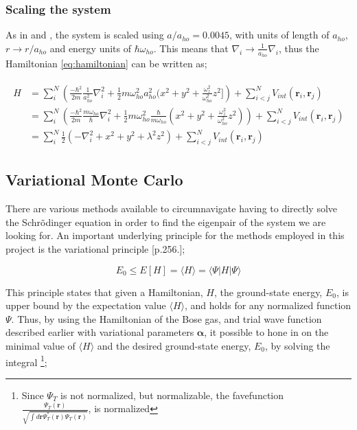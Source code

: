 \documentclass[%
oneside,                 %
final,                   %
10pt]{article}
\begin{document}
\subsubsection{Scaling the system}
As in \citep{VMCHJ} and \citep{VMCdubois}, the system is scaled using $a/a_{ho}=0.0045$, with units of length of $a_{ho}$, $r\rightarrow r/a_{ho}$ and energy units of $\hbar \omega_{ho}$. This means that $\nabla_i\rightarrow \frac{1}{a_{ho}} \nabla_i$, thus the Hamiltonian \eqref{eq:hamiltonian} can be written as;

\begin{align}
\begin{split}
  H &= \sum_i^N \left(\frac{-\hbar^2}{2m}\frac{1}{a_{ho}^2} \nabla_i^2 +
  \frac{1}{2}m \omega_{ho}^2a_{ho}^2(x^2+y^2+ \frac{\omega_z^2}{\omega_{ho}^2}z^2]  
  \right)  +
	 \sum_{i<j}^{N} V_{int}({\mathbf{r}}_i,{\mathbf{r}}_j) \\
	 &= \sum_i^N \left(\frac{-\hbar^2}{2m}\frac{m \omega_{ho}}{\hbar} \nabla_i^2 +
  \frac{1}{2}m   \omega_{ho}^2 \frac{\hbar}{m \omega_{ho}}(x^2+y^2+ \frac{\omega_z^2}{\omega_{ho}^2}z^2)  
  \right)  +
	 \sum_{i<j}^{N} V_{int}({\mathbf{r}}_i,{\mathbf{r}}_j) \\
	  &= \sum_i^N \frac{1}{2} \left(- \nabla_i^2 +x^2+y^2+ \lambda^2 z^2  
  \right)  +
	 \sum_{i<j}^{N} V_{int}({\mathbf{r}}_i,{\mathbf{r}}_j) \label{eq:scaled_H}
\end{split}
\end{align}
\subsection{Variational Monte Carlo} \label{S:VMC}
There are various methods available to circumnavigate having to directly solve the Schrõdinger equation in order to find the eigenpair of the system we are looking for. An important underlying principle for the methods employed in this project is the variational principle \citep{Griffiths95}[p.256.]; 

\begin{equation}
E_0\leq E[H]= \langle H \rangle = \langle \Psi | H | \Psi \rangle
\end{equation}

This principle states that given a Hamiltonian, $H$, the ground-state energy, $E_0$, is upper bound by the expectation value $\langle H \rangle $, and holds for any normalized function $\Psi$. Thus, by using the Hamiltonian of the Bose gas, and trial wave function described earlier with variational parameters $\bm \alpha$, it possible to hone in on the minimal value of $\langle H \rangle$ and the desired ground-state energy, $E_0$, by solving the integral \footnote{Since $\Psi_T$ is not normalized, but normalizable, the favefunction $\frac{\Psi_T(\bm r)}{\sqrt{\int d\bm r \Psi_T^* (\bm r) \Psi_T(\bm r)}}$, is normalized};
\end{document}
